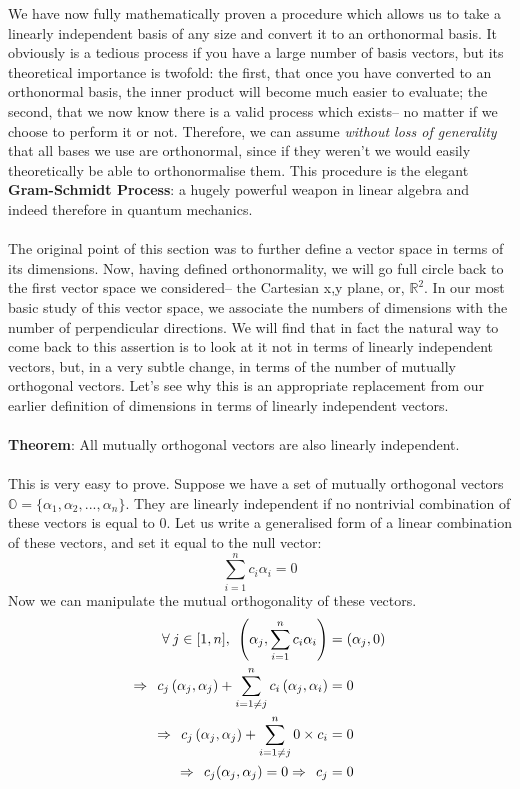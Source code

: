 We have now fully mathematically proven a procedure which allows us to take a linearly independent basis of any size and convert it to an orthonormal basis. It obviously is a tedious process if you have a large number of basis vectors, but its theoretical importance is twofold: the first, that once you have converted to an orthonormal basis, the inner product will become much easier to evaluate; the second, that we now know there is a valid process which exists-- no matter if we choose to perform it or not. Therefore, we can assume \textit{without loss of generality} that all bases we use are orthonormal, since if they weren't we would easily theoretically be able to orthonormalise them. This procedure is the elegant \textbf{Gram-Schmidt Process}: a hugely powerful weapon in linear algebra and indeed therefore in quantum mechanics.
\\\\
The original point of this section was to further define a vector space in terms of its dimensions. Now, having defined orthonormality, we will go full circle back to the first vector space we considered-- the Cartesian x,y plane, or, $\mathbb{R}^2$. In our most basic study of this vector space, we associate the numbers of dimensions with the number of perpendicular directions. We will find that in fact the natural way to come back to this assertion is to look at it not in terms of linearly independent vectors, but, in a very subtle change, in terms of the number of mutually orthogonal vectors. Let's see why this is an appropriate replacement from our earlier definition of dimensions in terms of linearly independent vectors.
\\\\
\textbf{Theorem}: All mutually orthogonal vectors are also linearly independent.
\\\\
This is very easy to prove. Suppose we have a set of mutually orthogonal vectors $\mathbb{O}=\{\alpha_{1}, \alpha_{2}, ..., \alpha_{n}\}$. They are linearly independent if no nontrivial combination of these vectors is equal to $0$. Let us write a generalised form of a linear combination of these vectors, and set it equal to the null vector:
$$
\sum_{i=1}^{n}c_{i}\alpha_{i}=0
$$
Now we can manipulate the mutual orthogonality of these vectors. 
$$
\begin{aligned}
\forall\: j \in [1,n], \:\: \left(\alpha_{j},\sum_{i=1}^{n}c_{i}\alpha_{i}\right) &=\left(\alpha_{j},0\right) \\ 
\Rightarrow\:\:  c_{j}\left(\alpha_{j},\alpha_{j}\right)+\sum_{i=1\neq j}^{n}c_{i}\left(\alpha_{j},\alpha_{i}\right) &= 0 \\
\Rightarrow\:\: c_{j}\left(\alpha_{j},\alpha_{j}\right)+\sum_{i=1\neq j}^{n}0\times c_{i} &= 0 \\ 
\Rightarrow\:\:  c_{j}(\alpha_{j},\alpha_{j})= 0 \Rightarrow\:\:c_{j} &= 0
\end{aligned}
$$
